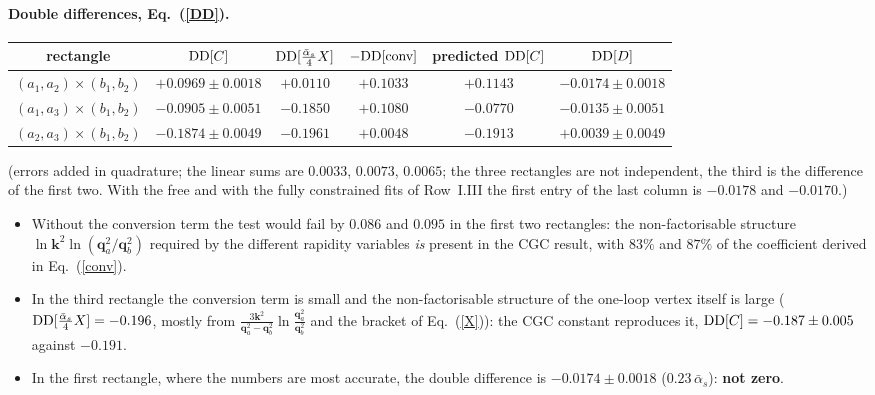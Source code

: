\documentclass[11pt,a4paper]{article}
\renewcommand{\v}[1]{\bm{#1}}
\newcommand{\ab}{\bar\alpha_s}
\begin{document}
\paragraph{Double differences, Eq.~(\ref{DD}).}
\begin{center}\small\setlength{\tabcolsep}{4pt}
\renewcommand{\arraystretch}{1.15}
\begin{tabular}{|c|c|c|c|c|c|}\hline
rectangle & ${\rm DD}[C]$ & ${\rm DD}[\frac{\ab}4X]$ & $-{\rm DD}[\text{conv}]$ & predicted ${\rm DD}[C]$ & ${\rm DD}[D]$\\\hline
$(a_1,a_2)\times(b_1,b_2)$ & $+0.0969\pm0.0018$ & $+0.0110$ & $+0.1033$ & $+0.1143$ & $-0.0174\pm0.0018$\\
$(a_1,a_3)\times(b_1,b_2)$ & $-0.0905\pm0.0051$ & $-0.1850$ & $+0.1080$ & $-0.0770$ & $-0.0135\pm0.0051$\\
$(a_2,a_3)\times(b_1,b_2)$ & $-0.1874\pm0.0049$ & $-0.1961$ & $+0.0048$ & $-0.1913$ & $+0.0039\pm0.0049$\\\hline
\end{tabular}
\end{center}
(errors added in quadrature; the linear sums are $0.0033$, $0.0073$, $0.0065$; the three rectangles are not independent, the third is the difference of the first two. With the free and with the fully constrained fits of Row~I.III the first entry of the last column is $-0.0178$ and $-0.0170$.)
\begin{itemize}
\item Without the conversion term the test would fail by $0.086$ and $0.095$ in the first two rectangles: the non-factorisable structure $\ln\v k^2\ln(\v q_a^2/\v q_b^2)$ required by the different rapidity variables \emph{is} present in the CGC result, with $83\%$ and $87\%$ of the coefficient derived in Eq.~(\ref{conv}).
\item In the third rectangle the conversion term is small and the non-factorisable structure of the one-loop vertex itself is large (${\rm DD}[\frac{\ab}{4}X]=-0.196$, mostly from $\frac{3\v k^2}{\v q_a^2-\v q_b^2}\ln\frac{\v q_a^2}{\v q_b^2}$ and the bracket of Eq.~(\ref{X})): the CGC constant reproduces it, ${\rm DD}[C]=-0.187\pm0.005$ against $-0.191$.
\item In the first rectangle, where the numbers are most accurate, the double difference is $-0.0174\pm0.0018$ ($0.23\,\ab$): \textbf{not zero}.
\end{itemize}
\end{document}
